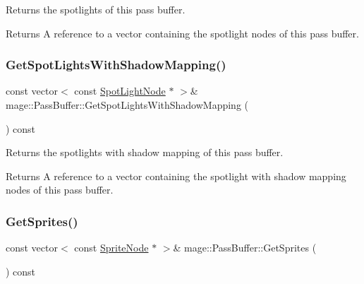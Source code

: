 Returns the spotlights of this pass buffer.

\begin{DoxyReturn}{Returns}
A reference to a vector containing the spotlight nodes of this pass buffer. 
\end{DoxyReturn}
\hypertarget{structmage_1_1_pass_buffer_a8f290f22cc01bbb4ec7f0986e0e0f3a1}{}\label{structmage_1_1_pass_buffer_a8f290f22cc01bbb4ec7f0986e0e0f3a1} 
\subsubsection{\texorpdfstring{Get\+Spot\+Lights\+With\+Shadow\+Mapping()}{GetSpotLightsWithShadowMapping()}}
{\footnotesize\ttfamily const vector$<$ const \hyperlink{namespacemage_aeed5dee4ff6c591eabb0e9114256df4a}{Spot\+Light\+Node} $\ast$ $>$\& mage\+::\+Pass\+Buffer\+::\+Get\+Spot\+Lights\+With\+Shadow\+Mapping (\begin{DoxyParamCaption}{ }\end{DoxyParamCaption}) const\hspace{0.3cm}{\ttfamily [noexcept]}}

Returns the spotlights with shadow mapping of this pass buffer.

\begin{DoxyReturn}{Returns}
A reference to a vector containing the spotlight with shadow mapping nodes of this pass buffer. 
\end{DoxyReturn}
\hypertarget{structmage_1_1_pass_buffer_a0ac14b71c0af69e946a37b4c2873d783}{}\label{structmage_1_1_pass_buffer_a0ac14b71c0af69e946a37b4c2873d783} 
\subsubsection{\texorpdfstring{Get\+Sprites()}{GetSprites()}}
{\footnotesize\ttfamily const vector$<$ const \hyperlink{classmage_1_1_sprite_node}{Sprite\+Node} $\ast$ $>$\& mage\+::\+Pass\+Buffer\+::\+Get\+Sprites (\begin{DoxyParamCaption}{ }\end{DoxyParamCaption}) const\hspace{0.3cm}{\ttfamily [noexcept]}}

